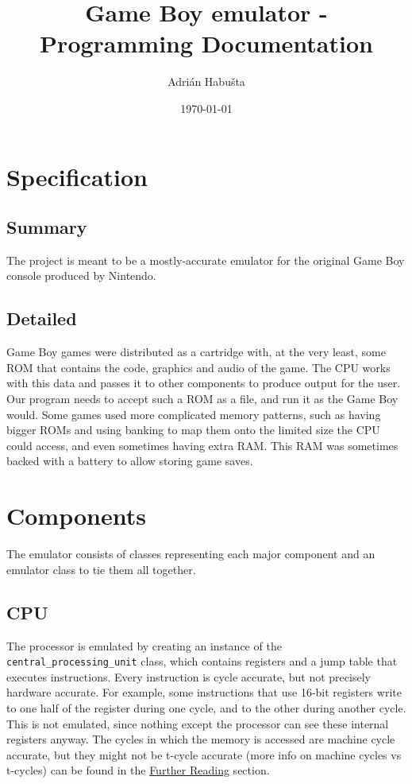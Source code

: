 \documentclass{article}
\author{Adrián Habušta}
\title{Game Boy emulator - Programming Documentation}
\date{\today}
\begin{document}
    \maketitle
    \newpage

    \tableofcontents
    \newpage

    \section{Specification}
        \subsection{Summary}
            The project is meant to be a mostly-accurate emulator for the
            original Game Boy console produced by Nintendo.

        \subsection{Detailed}
            Game Boy games were distributed as a cartridge with, at the very
            least, some ROM that contains the code, graphics and audio of the
            game. The CPU works with this data and passes it to other components
            to produce output for the user. Our program needs to accept such a
            ROM as a file, and run it as the Game Boy would. Some games used
            more complicated memory patterns, such as having bigger ROMs and
            using banking to map them onto the limited size the CPU could
            access, and even sometimes having extra RAM. This RAM was sometimes
            backed with a battery to allow storing game saves.

    \section{Components}
        The emulator consists of classes representing each major component and
        an emulator class to tie them all together.
        \subsection{CPU}
            The processor is emulated by creating an instance of the \\
            \verb|central_processing_unit| class, which contains
            registers and a jump table that executes instructions. Every
            instruction is cycle accurate, but not precisely hardware accurate.
            For example, some instructions that use 16-bit registers write to
            one half of the register during one cycle, and to the other during
            another cycle. This is not emulated, since nothing except the
            processor can see these internal registers anyway. The cycles in
            which the memory is accessed are machine cycle accurate, but they
            might not be t-cycle accurate (more info on machine cycles vs
            t-cycles) can be found in the \hyperref[sec:furtherReading]{Further Reading}
            section.
\end{document}
